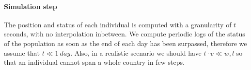 \paragraph{Simulation step}
The position and status of each individual is computed with a granularity of $t$ seconds, with no interpolation inbetween.
We compute periodic logs of the status of the population as soon as the end of each day has been surpassed, therefore we assume that $t \ll \SI{1}{day}$. Also, in a realistic scenario we should have $t \cdot v \ll w,l$ so that an individual cannot span a whole country in few steps.